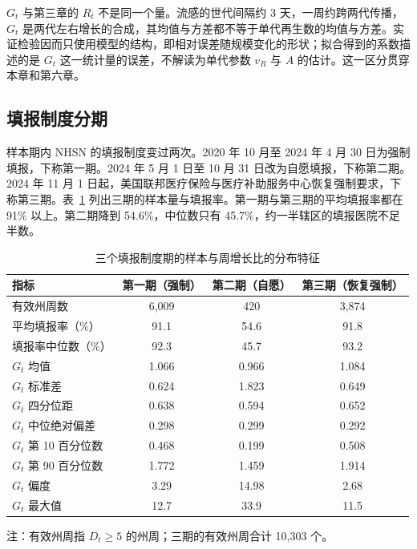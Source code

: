 $G_t$ 与第三章的 $R_t$ 不是同一个量。流感的世代间隔约 3 天，一周约跨两代传播，$G_t$ 是两代左右增长的合成，其均值与方差都不等于单代再生数的均值与方差。实证检验因而只使用模型的结构，即相对误差随规模变化的形状；拟合得到的系数描述的是 $G_t$ 这一统计量的误差，不解读为单代参数 $v_R$ 与 $A$ 的估计。这一区分贯穿本章和第六章。

\subsection{填报制度分期}

样本期内 NHSN 的填报制度变过两次。2020 年 10 月至 2024 年 4 月 30 日为强制填报，下称第一期。2024 年 5 月 1 日至 10 月 31 日改为自愿填报，下称第二期。2024 年 11 月 1 日起，美国联邦医疗保险与医疗补助服务中心恢复强制要求，下称第三期。表~\ref{tab:policy} 列出三期的样本量与填报率。第一期与第三期的平均填报率都在 91\% 以上。第二期降到 54.6\%，中位数只有 45.7\%，约一半辖区的填报医院不足半数。

\begin{table}[!tbp]
  \centering
  \caption{三个填报制度期的样本与周增长比的分布特征}
  \label{tab:policy}
  \begin{tabular}{@{}lccc@{}}
    \toprule
    指标 & 第一期（强制） & 第二期（自愿） & 第三期（恢复强制） \\
    \midrule
    有效州周数 & 6,009 & 420 & 3,874 \\
    平均填报率（\%） & 91.1 & 54.6 & 91.8 \\
    填报率中位数（\%） & 92.3 & 45.7 & 93.2 \\
    $G_t$ 均值 & 1.066 & 0.966 & 1.084 \\
    $G_t$ 标准差 & 0.624 & 1.823 & 0.649 \\
    $G_t$ 四分位距 & 0.638 & 0.594 & 0.652 \\
    $G_t$ 中位绝对偏差 & 0.298 & 0.299 & 0.292 \\
    $G_t$ 第 10 百分位数 & 0.468 & 0.199 & 0.508 \\
    $G_t$ 第 90 百分位数 & 1.772 & 1.459 & 1.914 \\
    $G_t$ 偏度 & 3.29 & 14.98 & 2.68 \\
    $G_t$ 最大值 & 12.7 & 33.9 & 11.5 \\
    \bottomrule
  \end{tabular}

  \vspace{4pt}
  {\small 注：有效州周指 $D_t\geq5$ 的州周；三期的有效州周合计 10,303 个。}
\end{table}

